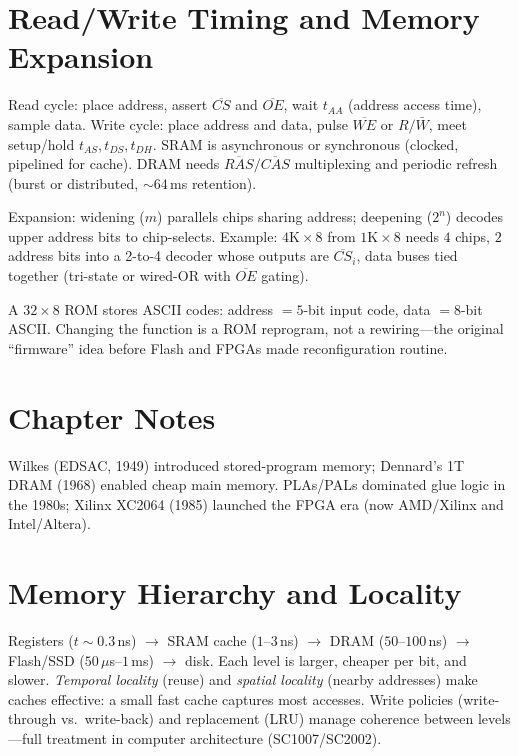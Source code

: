 \section{Read/Write Timing and Memory Expansion}
Read cycle: place address, assert $\overline{CS}$ and $\overline{OE}$, wait $t_{AA}$ (address access time), sample data.
Write cycle: place address and data, pulse $\overline{WE}$ or $R/\bar W$, meet setup/hold $t_{AS},t_{DS},t_{DH}$. SRAM is asynchronous
or synchronous (clocked, pipelined for cache). DRAM needs $\overline{RAS}/\overline{CAS}$ multiplexing and periodic refresh
(burst or distributed, $\sim64$\,ms retention).

Expansion: widening ($m$) parallels chips sharing address; deepening ($2^n$) decodes upper address bits to chip-selects.
Example: $4\text{K}\times8$ from $1\text{K}\times8$ needs $4$ chips, $2$ address bits into a 2-to-4 decoder whose outputs are $\overline{CS}_i$,
data buses tied together (tri-state or wired-OR with $\overline{OE}$ gating).
\begin{example}
A $32\times8$ ROM stores ASCII codes: address $=5$-bit input code, data $=8$-bit ASCII. Changing the function is a ROM reprogram,
not a rewiring---the original ``firmware'' idea before Flash and FPGAs made reconfiguration routine.
\end{example}


\section{Chapter Notes}
Wilkes (EDSAC, 1949) introduced stored-program memory; Dennard's 1T DRAM (1968) enabled cheap main memory.
PLAs/PALs dominated glue logic in the 1980s; Xilinx XC2064 (1985) launched the FPGA era (now AMD/Xilinx and Intel/Altera).

\section{Memory Hierarchy and Locality}
Registers ($t\sim0.3$\,ns) $\to$ SRAM cache ($1$--$3$\,ns) $\to$ DRAM ($50$--$100$\,ns) $\to$ Flash/SSD ($50\,\mu$s--$1$\,ms) $\to$ disk.
Each level is larger, cheaper per bit, and slower. \emph{Temporal locality} (reuse) and \emph{spatial locality} (nearby addresses)
make caches effective: a small fast cache captures most accesses. Write policies (write-through vs.\ write-back) and replacement
(LRU) manage coherence between levels---full treatment in computer architecture (SC1007/SC2002).

